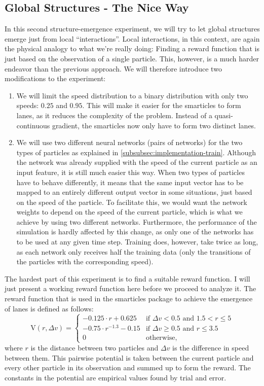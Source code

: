\subsection{Global Structures - The Nice Way}
\label{subsec:global_structure_nice}
In this second structure-emergence experiment, we will try to let global structures emerge just from local \enquote{interactions}. Local interactions, in this context, are again the physical analogy to what we're really doing: Finding a reward function that is just based on the observation of a single particle. This, however, is a much harder endeavor than the previous approach. We will therefore introduce two modifications to the experiment:
\begin{enumerate}
    \item We will limit the speed distribution to a binary distribution with only two speeds: $0.25$ and $0.95$. This will make it easier for the smarticles to form lanes, as it reduces the complexity of the problem. Instead of a quasi-continuous gradient, the smarticles now only have to form two distinct lanes.
    \item We will use two different neural networks (pairs of networks) for the two types of particles as explained in \ref{subsubsec:implementation-train}. Although the network was already supplied with the speed of the current particle as an input feature, it is still much easier this way. When two types of particles have to behave differently, it means that the same input vector has to be mapped to an entirely different output vector in some situations, just based on the speed of the particle. To facilitate this, we would want the network weights to depend on the speed of the current particle, which is what we achieve by using two different networks. Furthermore, the performance of the simulation is hardly affected by this change, as only one of the networks has to be used at any given time step. Training does, however, take twice as long, as each network only receives half the training data (only the transitions of the particles with the corresponding speed).
\end{enumerate}
The hardest part of this experiment is to find a suitable reward function. I will just present a working reward function here before we proceed to analyze it. The reward function that is used in the smarticles package to achieve the emergence of lanes is defined as follows:
\begin{equation}
    \text{V}(r, \Delta v) = \begin{cases}
        -0.125 \cdot r + 0.625 & \text{if } \Delta v < 0.5 \text{ and } 1.5 < r \le 5 \\
        -0.75 \cdot r^{-1.3} - 0.15 & \text{if } \Delta v \ge 0.5 \text{ and } r \le 3.5 \\
        0 & \text{otherwise} \text{,}
    \end{cases}
    \label{eq:lane_reward_func}
\end{equation}
where $r$ is the distance between two particles and $\Delta v$ is the difference in speed between them. This pairwise potential is taken between the current particle and every other particle in its observation and summed up to form the reward. The constants in the potential are empirical values found by trial and error. 


